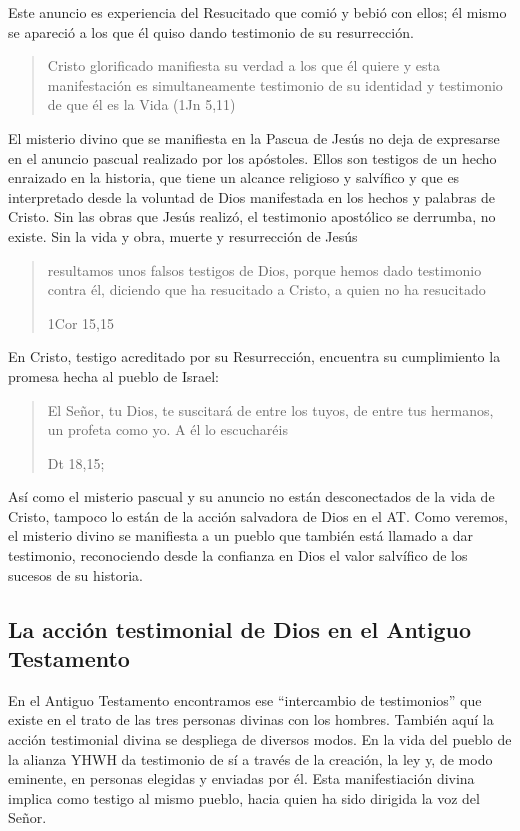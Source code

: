Este anuncio es experiencia del Resucitado que comió y bebió con ellos; él mismo
se apareció a los que él quiso dando testimonio de su resurrección.
\blockquote[{\cite[129]{prades2015testimonio}}]{Cristo glorificado manifiesta su
  verdad a los que él quiere y esta manifestación es simultaneamente testimonio
  de su identidad y testimonio de que él es la Vida (1Jn 5,11)}

El misterio divino que se manifiesta en la Pascua de Jesús no deja de expresarse
en el anuncio pascual realizado por los apóstoles. Ellos son testigos de un
hecho enraizado en la historia, que tiene un alcance religioso y salvífico y que
es interpretado desde la voluntad de Dios manifestada en los hechos y palabras
de Cristo. Sin las obras que Jesús realizó, el testimonio apostólico se
derrumba, no existe.\autocite[Cf.][1529]{latourelle2000testimonio} Sin la vida y
obra, muerte y resurrección de Jesús \blockquote[1Cor 15,15]{resultamos unos
  falsos testigos de Dios, porque hemos dado testimonio contra él, diciendo que
  ha resucitado a Cristo, a quien no ha resucitado}.

En Cristo, testigo acreditado por su Resurrección, encuentra su cumplimiento la
promesa hecha al pueblo de Israel: \blockquote[Dt 18,15;
{\cite[Cf.~][24ss]{ratzinger2007jdenaz}}]{El Señor, tu Dios, te suscitará de
  entre los tuyos, de entre tus hermanos, un profeta como yo. A él lo
  escucharéis}. Así como el misterio pascual y su anuncio no están desconectados
de la vida de Cristo, tampoco lo están de la acción salvadora de Dios en el AT.
Como veremos, el misterio divino se manifiesta a un pueblo que también está
llamado a dar testimonio, reconociendo desde la confianza en Dios el valor
salvífico de los sucesos de su historia.

\subsection{La acción testimonial de Dios en el Antiguo Testamento}

En el Antiguo Testamento encontramos ese \enquote{intercambio de testimonios}
que existe en el trato de las tres personas divinas con los
hombres.\autocite[Cf.][1531]{latourelle2000testimonio} También aquí la acción
testimonial divina se despliega de diversos modos. En la vida del pueblo de la
alianza YHWH da testimonio de sí a través de la creación, la ley y, de modo
eminente, en personas elegidas y enviadas por
él.\autocite[Cf.][114s]{prades2015testimonio} Esta manifestiación divina implica
como testigo al mismo pueblo, hacia quien ha sido dirigida la voz del Señor.

